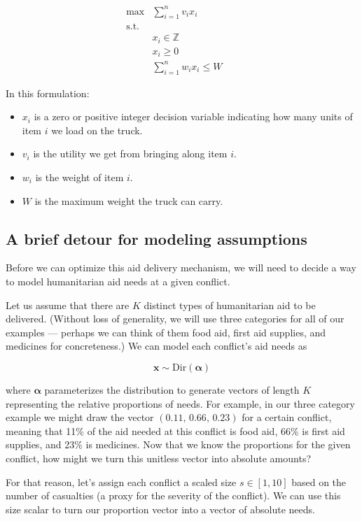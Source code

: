 \documentclass{article} %
\begin{document}
\begin{align*}
\max &\sum_{i=1}^n v_i x_i &&  \\
\mathrm{s.t.} & \\
    & x_i \in \mathbb{Z} \\
    & x_i \geq 0 \\
	& \sum_{i=1}^n w_ix_i \leq W
\end{align*}

In this formulation:

\begin{itemize}
  \item $x_{i}$ is a zero or positive integer decision variable indicating how many units of item $i$
        we load on the truck.
  \item $v_i$ is the utility we get from bringing along item $i$.
  \item $w_i$ is the weight of item $i$.
  \item $W$ is the maximum weight the truck can carry.
\end{itemize}

\subsection{A brief detour for modeling assumptions}

Before we can optimize this aid delivery mechanism, we will need to decide a way to model humanitarian aid needs at a given conflict.

Let us assume that there are $K$ distinct types of humanitarian aid to be delivered. (Without loss of generality, we will use three categories for all of our examples --- perhaps we can think of them food aid, first aid supplies, and medicines for concreteness.) We can model each conflict's aid needs as

$$\boldsymbol x \sim \mathrm{Dir}(\boldsymbol \alpha)$$

where $\boldsymbol \alpha$ parameterizes the distribution to generate vectors of length $K$ representing the relative proportions of needs.\cite{Murphy} For example, in our three category example we might draw the vector $(0.11,\,0.66,\,0.23)$ for a certain conflict, meaning that 11\% of the aid needed at this conflict is food aid, 66\% is first aid supplies, and 23\% is medicines. Now that we know the proportions for the given conflict, how might we turn this unitless vector into absolute amounts?

For that reason, let's assign each conflict a scaled size $s \in [1, 10]$ based on the number of casualties (a proxy for the severity of the conflict). We can use this size scalar to turn our proportion vector into a vector of absolute needs.
\end{document}
